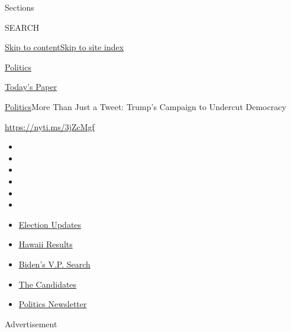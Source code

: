Sections

SEARCH

\protect\hyperlink{site-content}{Skip to
content}\protect\hyperlink{site-index}{Skip to site index}

\href{https://www.nytimes.com/section/politics}{Politics}

\href{https://myaccount.nytimes.com/auth/login?response_type=cookie\&client_id=vi}{}

\href{https://www.nytimes.com/section/todayspaper}{Today's Paper}

\href{/section/politics}{Politics}\textbar{}More Than Just a Tweet:
Trump's Campaign to Undercut Democracy

\href{https://nyti.ms/3jZcMgf}{https://nyti.ms/3jZcMgf}

\begin{itemize}
\item
\item
\item
\item
\item
\item
\end{itemize}

\begin{itemize}
\item
  \href{https://www.nytimes.com/2020/08/07/us/elections/biden-vs-trump.html?action=click\&pgtype=Article\&state=default\&region=TOP_BANNER\&context=storylines_menu}{Election
  Updates}
\item
  \href{https://www.nytimes.com/interactive/2020/08/08/us/elections/results-hawaii-primary-elections.html?action=click\&pgtype=Article\&state=default\&region=TOP_BANNER\&context=storylines_menu}{Hawaii
  Results}
\item
  \href{https://www.nytimes.com/article/biden-vice-president-2020.html?action=click\&pgtype=Article\&state=default\&region=TOP_BANNER\&context=storylines_menu}{Biden's
  V.P. Search}
\item
  \href{https://www.nytimes.com/interactive/2019/us/politics/2020-presidential-candidates.html?action=click\&pgtype=Article\&state=default\&region=TOP_BANNER\&context=storylines_menu}{The
  Candidates}
\item
  \href{https://www.nytimes.com/newsletters/politics?action=click\&pgtype=Article\&state=default\&region=TOP_BANNER\&context=storylines_menu}{Politics
  Newsletter}
\end{itemize}

Advertisement

